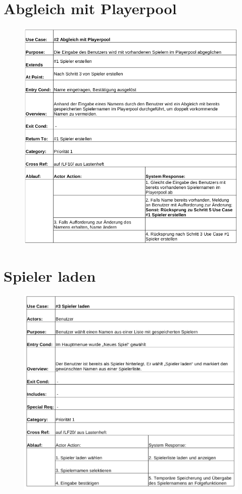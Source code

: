 \section{Abgleich mit Playerpool}
\begin{figure}[!h]
	\centering
    \includegraphics[width=\textwidth]{./ucbAbgleichPlayerpool.png}
	\label{}
\end{figure}


\clearpage
\section{Spieler laden}
\begin{figure}[!h]
	\centering
    \includegraphics[width=\textwidth]{./ucbSpielerLaden.png}
	\label{}
\end{figure}


